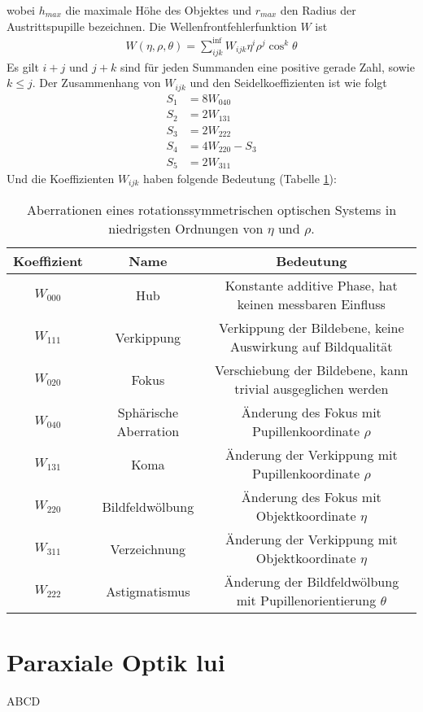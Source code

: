 \documentclass[twoside,colorback,accentcolor=tud4c,11pt]{tudreport}
\begin{document}
wobei $ h_{max} $ die maximale Höhe des Objektes
und $ r_{max} $ den Radius der Austrittspupille bezeichnen. Die Wellenfrontfehlerfunktion $W$ ist
\begin{align}
W(\eta,\rho,\theta)=\sum_{ijk}^{\inf}W_{ijk}\eta^i\rho^j\cos^k\theta
\end{align}
Es gilt $i+j$ und $j+k$ sind für jeden Summanden eine positive gerade Zahl, sowie $k\leq j$. Der Zusammenhang von $ W_{ijk} $ und den Seidelkoeffizienten ist wie folgt
\begin{align}
S_1&=8W_{040}\\
S_2&=2W_{131}\\
S_3&=2W_{222}\\
S_4&=4W_{220}-S_3\\
S_5&=2W_{311}
\end{align}
Und die Koeffizienten $ W_{ijk} $ haben folgende Bedeutung (Tabelle \ref{tab:W}):
\begin{table}[H]
\centering
\begin{tabular}{|c|c|c|}
\hline 
Koeffizient & Name & Bedeutung \\ 
\hline 
$W_{000}$ & Hub & Konstante additive Phase, hat keinen messbaren Einfluss \\ 
$W_{111}$ & Verkippung & Verkippung der Bildebene, keine Auswirkung auf Bildqualität \\ 
$W_{020}$ & Fokus & Verschiebung der Bildebene, kann trivial ausgeglichen werden \\ 
\hline 
$W_{040}$ & Sphärische Aberration & Änderung des Fokus mit Pupillenkoordinate $\rho$ \\  
$W_{131}$ & Koma & Änderung der Verkippung mit Pupillenkoordinate $\rho$ \\
$W_{220}$ & Bildfeldwölbung & Änderung des Fokus mit Objektkoordinate $\eta$ \\
$W_{311}$ & Verzeichnung & Änderung der Verkippung mit Objektkoordinate $\eta$ \\ 
$W_{222}$ & Astigmatismus & Änderung der Bildfeldwölbung mit Pupillenorientierung $\theta$ \\ 
\hline 
\end{tabular} 
\caption{Aberrationen eines rotationssymmetrischen optischen Systems in niedrigsten Ordnungen von $\eta$ und $\rho$. \cite{anl}} \label{tab:W}
\end{table}
\section{Paraxiale Optik lui}
ABCD
\end{document}
